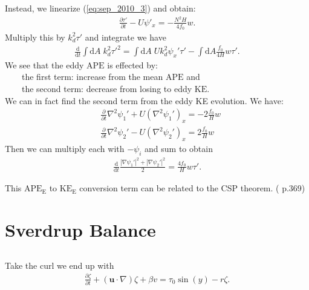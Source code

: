 \documentclass[11pt,letterpaper]{book}
\theoremstyle{definition}
\newcommand{\de}{\mathrm{d}}
\newcommand{\pe}{\partial}
\newcommand{\ve}[1]{\boldsymbol{#1}}
\newcommand{\APE}{\text{APE}}
\newcommand{\KE}{\text{KE}}
\newcommand{\ssp}{\left.\qquad\right.}
\begin{document}
Instead, we linearize (\ref{eq:sep_2010_3}) and obtain:
\begin{align*}
\frac{\pe\tau'}{\pe t}-U\psi'_x = -\frac{N^2H}{4f_0} w.
\end{align*}
Multiply this by $k_d^2\tau'$ and integrate we have
\begin{align*}
\frac{\de}{\de t}\int\de A \;k_d^2\tau'^2 = \int\de A \;Uk_d^2\psi_x'\tau' -\int\de A \frac{f_0}{4H}w\tau'.
\end{align*}
We see that the eddy $\APE$ is effected by: \\
$\ssp$the first term: increase from the mean $\APE$ and\\
$\ssp$the second term: decrease from losing to eddy $\KE$.\\
We can in fact find the second term from the eddy KE evolution. We have:
\begin{align*}
    &\frac{\pe}{\pe t}\nabla^2\psi_1'+U(\nabla^2\psi_1')_x = -2\frac{f_0}{H}w\\
    &\frac{\pe}{\pe t}\nabla^2\psi_2'-U(\nabla^2\psi_2')_x = 2\frac{f_0}{H}w
\end{align*}
Then we can multiply each with $-\psi_i$ and sum to obtain
\begin{align*}
    \frac{\de}{\de t}\frac{|\nabla\psi_1'|^2+|\nabla\psi_2'|^2}{2} = \frac{4f_0}{H}w\tau'.
\end{align*}

This $\APE_\text{E}$ to $\KE_\text{E}$ conversion term can be related to the CSP theorem. (\cite{vallis} p.369)


\section{Sverdrup Balance}
\subsection{}
Take the curl we end up with 
\begin{align}
\frac{\pe\zeta}{\pe t}+(\ve u\cdot \nabla)\zeta+\beta v = \tau_0\sin(y)-r\zeta.\label{sep_2010_4_1}
\end{align}
\end{document}
